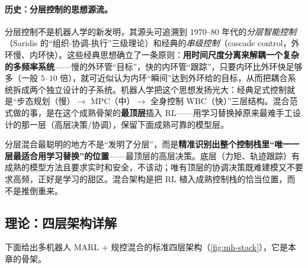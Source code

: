 \paragraph{历史：分层控制的思想源流。}
分层控制不是机器人学的新发明，其源头可追溯到 1970--80 年代的\emph{分层智能控制}（Saridis 的“组织-协调-执行”三级理论）和经典的\emph{串级控制}（cascade control，外环慢、内环快）。这些经典思想确立了一条原则：\textbf{用时间尺度分离来解耦一个复杂的多频率系统}——慢的外环管“目标”，快的内环管“跟踪”，只要内环比外环快足够多（一般 $5$--$10$ 倍），就可近似认为内环“瞬间”达到外环给的目标，从而把耦合系统拆成两个独立设计的子系统。机器人学把这个思想发扬光大：经典足式控制就是“步态规划（慢）$\to$ MPC（中）$\to$ 全身控制 WBC（快）”三层结构。混合范式做的事，是在这个成熟骨架的\textbf{最顶层}插入 RL——用学习替换掉原来最难手工设计的那一层（高层决策/协调），保留下面成熟可靠的模型层。

\begin{insight}
分层混合最聪明的地方不是“发明了分层”，而是\textbf{精准识别出整个控制栈里“唯一一层最适合用学习替换”的位置}——最顶层的高层决策。底层（力矩、轨迹跟踪）有成熟的模型方法且要求实时和安全，不该动；唯有顶层的协调决策既难建模又不要求高频，正好是学习的甜区。混合架构是把 RL 植入成熟控制栈的恰当位置，而不是推倒重来。
\end{insight}

\subsection{理论：四层架构详解}
\label{sec:mh-four-levels}

下面给出多机器人 MARL $+$ 规控混合的标准四层架构（\cref{fig:mh-stack}），它是本章的骨架。

